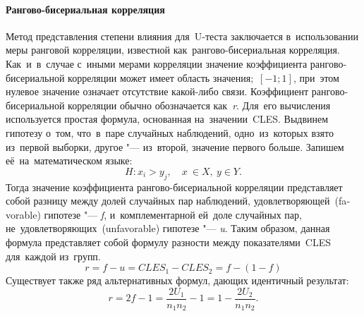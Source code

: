 \documentclass[]{scrreprt}
\begin{document}
\paragraph{Рангово-бисериальная корреляция}
Метод представления степени влияния для~U-теста заключается в~использовании меры ранговой корреляции, известной как~рангово-бисериальная корреляция. Как~и~в~случае с~иными мерами корреляции значение коэффициента рангово-бисериальной корреляции может имеет область значения;~${\textstyle [-1;1]}$, при~этом нулевое значение означает отсутствие какой-либо связи. Коэффициент рангово-бисериальной корреляции обычно обозначается как~\textit{r}. Для~его вычисления используется простая формула, основанная на~значении~CLES. Выдвинем гипотезу о~том, что~в~паре случайных наблюдений, одно~из~которых взято из~первой выборки, другое "--- из~второй, значение первого больше. Запишем её~на~математическом языке:
\begin{equation}\label{eq:RBC-hypothesis}
H: x_{i} > y_{j}, \quad x \ \in X,\ y \in Y.
\end{equation} 
Тогда значение коэффициента рангово-бисериальной корреляции представляет собой разницу между долей случайных пар наблюдений, удовлетворяющей~(\foreignlanguage{english}{favorable}) гипотезе "--- \textit{f}, и~комплементарной ей~доле случайных пар, не~удовлетворяющих~(\foreignlanguage{english}{unfavorable}) гипотезе "--- \textit{u}. Таким образом, данная формула представляет собой формулу разности между показателями~CLES для~каждой из~групп.
\begin{equation}\label{eq:RBC-formula-1}
r = f - u = CLES_{1} - CLES_{2} = f - (1 - f)
\end{equation}
Существует также ряд альтернативных формул, дающих идентичный результат:
\begin{equation}\label{eq:RBC-formula-2}
r = 2f -1 = \frac{2U_{1}}{n_{1}n_{2}}-1 = 1 - \frac{2U_{2}}{n_{1}n_{2}}.
\end{equation}	
\end{document}
